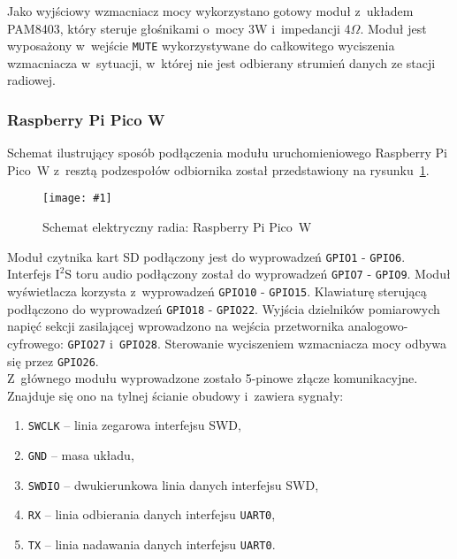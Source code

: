 \documentclass[polish]{aghengthesis}
\newcommand{\imgint}[4]{
	\begin{figure}[{#4}]
		\centering
		\texttt{[image: \#1]}
		\caption{#2}
		\label{#1}
	\end{figure}
}
\newcommand{\imgh}[3]{\imgint{#1}{#2}{#3}{H}}
\newcommand{\isqs}{$\text{I}^{2}\text{S}$}
\begin{document}
				Jako wyjściowy wzmacniacz mocy wykorzystano gotowy moduł z~układem PAM8403\textsuperscript{\cite{hw_amp}}, który steruje głośnikami o~mocy 3W i~impedancji 4$\Omega$. Moduł jest wyposażony w~wejście \lstinline|MUTE| wykorzystywane do całkowitego wyciszenia wzmacniacza w~sytuacji, w~której nie jest odbierany strumień danych ze stacji radiowej.
				
			\subsubsection{Raspberry Pi Pico W}
				Schemat ilustrujący sposób podłączenia modułu uruchomieniowego Raspberry Pi Pico~W z~resztą podzespołów odbiornika został przedstawiony na rysunku~\ref{3/hw_kicad_sch_picow}.
				\imgh{3/hw_kicad_sch_picow}{Schemat elektryczny radia: Raspberry Pi Pico~W}{0.65}
				
				Moduł czytnika kart SD podłączony jest do wyprowadzeń \lstinline|GPIO1| - \lstinline|GPIO6|.
				Interfejs \isqs{} toru audio podłączony został do wyprowadzeń \lstinline|GPIO7| - \lstinline|GPIO9|.
				Moduł wyświetlacza korzysta z~wyprowadzeń \lstinline|GPIO10| - \lstinline|GPIO15|. Klawiaturę sterującą podłączono do wyprowadzeń \lstinline|GPIO18| - \lstinline|GPIO22|. Wyjścia dzielników pomiarowych napięć sekcji zasilającej wprowadzono na wejścia przetwornika analogowo-cyfrowego: \lstinline|GPIO27| i~\lstinline|GPIO28|. Sterowanie wyciszeniem wzmacniacza mocy odbywa się przez \lstinline|GPIO26|.
				$ $\\
				
				Z~głównego modułu wyprowadzone zostało 5-pinowe złącze komunikacyjne. Znajduje się ono na tylnej ścianie obudowy i~zawiera sygnały:
				\begin{enumerate}
					\setlength{\itemsep}{0cm}
					\item \lstinline|SWCLK| -- linia zegarowa interfejsu SWD\textsuperscript{\cite{swd}},
					\item \lstinline|GND| -- masa układu,
					\item \lstinline|SWDIO| -- dwukierunkowa linia danych interfejsu SWD,
					\item \lstinline|RX| -- linia odbierania danych interfejsu \lstinline|UART0|,
					\item \lstinline|TX| -- linia nadawania danych interfejsu \lstinline|UART0|.
				\end{enumerate}
				
\end{document}
